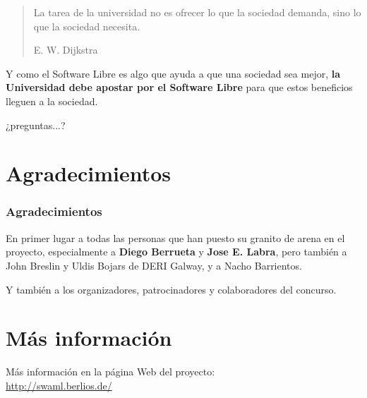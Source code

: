\documentclass[spanish,notes=hide]{beamer}
\begin{document}
\frame
{

  \begin{quote}
    \begin{Large}
      La tarea de la universidad no es ofrecer lo que la sociedad demanda, 
      sino lo que la sociedad necesita.
    \end{Large}
    \begin{flushright}E. W. Dijkstra\end{flushright}
  \end{quote}

  \vspace{1cm}

  \begin{Large}
    Y como el Software Libre es algo que ayuda a que una sociedad sea mejor, 
    \textbf{la Universidad debe apostar por el Software Libre} para que estos
    beneficios lleguen a la sociedad.
  \end{Large}

}


\frame
{

  \begin{center}
     \begin{Large}¿preguntas...?\end{Large}
  \end{center}

}

\appendix

\section{Agradecimientos}
\frame
{
  \frametitle{Agradecimientos}

  \begin{Large}
    En primer lugar a todas las personas que han puesto su granito de arena en el 
    proyecto, especialmente a \textbf{Diego Berrueta} y \textbf{Jose E. Labra}, 
    pero también a John Breslin y Uldis Bojars de DERI Galway, y a Nacho Barrientos.
  \end{Large}

  \vspace{1cm}

  \begin{Large}
    Y también a los organizadores, patrocinadores y colaboradores del concurso.
  \end{Large}

}

\section{Más información}
\frame
{
  \begin{center}
    Más información en la página Web del proyecto:\\
    \vspace{1cm}
    \LARGE{\href{http://swaml.berlios.de/}{http://swaml.berlios.de/}}\\
  \end{center}

}
\end{document}
